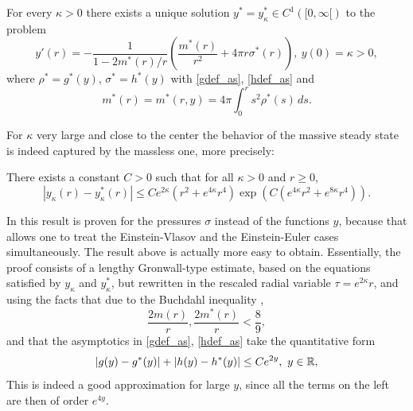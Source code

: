 \documentclass[11pt]{article}
\begin{document}
\begin{lemma}
  For every $\kappa >0$ there exists a unique
  solution $y^\ast=y^\ast_\kappa\in C^1([0,\infty[)$ to the problem
  \begin{equation} \label{grzeq}
    y'(r)= - \frac{1}{1-2 m^\ast(r)/r} \left(\frac{m^\ast(r)}{r^2}
    + 4 \pi r \sigma^\ast(r)\right) ,\ 
    y(0)=\kappa>0,
  \end{equation}
  where $\rho^\ast=g^\ast(y)$, $\sigma^\ast=h^\ast(y)$ with
  \eqref{gdef_as}, \eqref{hdef_as} and
  \[ 
  m^\ast(r) = m^\ast(r,y) = 4\pi \int_0^r s^2 \rho^\ast(s)\, ds.
  \]
\end{lemma}
%
%
For $\kappa$ very large and close to the center the behavior of the
massive steady state is indeed captured by the massless one, more precisely:
%
\begin{lemma} \label{p-pml}
  There exists a constant $C>0$ 
  such that for all $\kappa > 0$ and $r\geq 0$,
  \[
  |y_\kappa(r) - y^\ast_\kappa (r)|
  \leq
  C e^{2\kappa} \left(r^2 + e^{4\kappa} r^4 \right)
  \exp\left(C\left(e^{4\kappa} r^2 + e^{8\kappa} r^4\right)\right) .
  \]
\end{lemma}
%
In \cite[Lemma~3.10]{HaLinRe} this result is proven for the pressures
$\sigma$ instead of the functions $y$, because that allows one to
treat the Einstein-Vlasov and the Einstein-Euler cases simultaneously.
The result above is actually more easy to obtain.
Essentially, the proof consists of a lengthy Gronwall-type
estimate, based on the equations satisfied by $y_\kappa$ and $y^\ast_\kappa$,
but rewritten in the rescaled radial variable $\tau= e^{2\kappa} r$,
and using the facts that due to the Buchdahl inequality
\cite{Andr2007,Andr2008},
\[
\frac{2 m(r)}{r}, \frac{2 m^\ast (r)}{r} < \frac{8}{9},
\]
and that the asymptotics in \eqref{gdef_as}, \eqref{hdef_as} take the
quantitative form
\[
|g(y) - g^\ast(y)| + |h(y) - h^\ast(y)| \leq C e^{2y},\ y\in \mathbb R,
\]
This is indeed a good approximation
for large $y$, since all the terms on the left are then of order $e^{4y}$.
\end{document}
